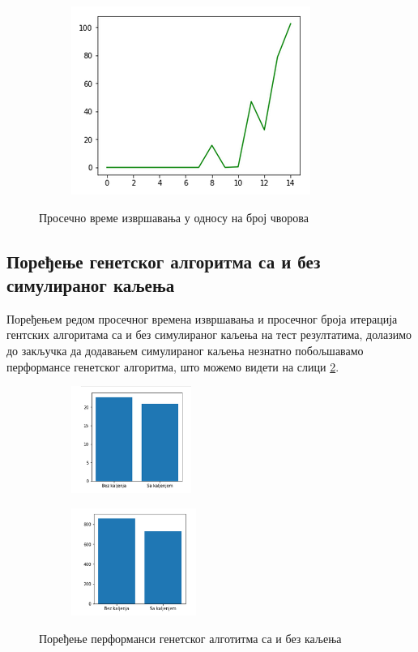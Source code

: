 \documentclass[a4paper]{article}
\begin{document}
{\begin{figure}[h!]
\begin{subfigure}{.3\textwidth}
		\centering
		\includegraphics[width=\linewidth]{images/gaa_time.png}
	\end{subfigure}
\caption{Просечно време извршавања у односу на број чворова}
\label{times}
\end{figure}

\subsection{Поређење генетског алгоритма са и без симулираног каљења}
Поређењем редом просечног времена извршавања и просечног броја итерација гентских алгоритама са и без симулираног каљења на тест резултатима, долазимо до закључка да додавањем симулираног каљења незнатно побољшавамо перформансе генетског алгоритма, што можемо видети на слици \ref{performance_comp}.

\begin{figure}[h!]
	\centering
	\begin{subfigure}{.4\textwidth}
		\centering
		\includegraphics[width=\linewidth,height=3.5cm]{images/time_compare.png}
	\end{subfigure}
	\begin{subfigure}{.4\textwidth}
		\centering
		\includegraphics[width=\linewidth,height=3.5cm]{images/iters_compare.png}
	\end{subfigure}
	\caption{Поређење перформанси генетског алготитма са и без каљења}
	\label{performance_comp}
\end{figure}

}
\end{document}

